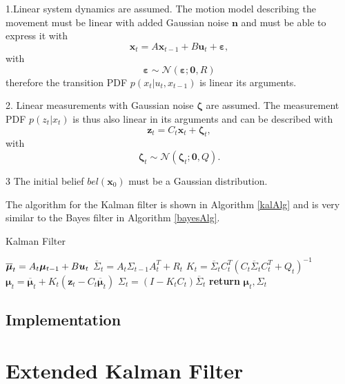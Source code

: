\documentclass[12pt,oneside,openany,a4paper, %
afrikaans,english,
]{memoir}
\numberwithin{equation}{chapter}
\begin{document}
1.Linear system dynamics are assumed. The motion model describing the movement must be linear with added Gaussian noise $\bm{n}$ and must be able to express it with 
\begin{equation}
\bm{x}_t = A \bm{x}_{t - 1} + B \bm{u}_t + \bm{\varepsilon},
\end{equation}
with 
\begin{equation}
\bm{\varepsilon} \sim \mathcal{N}(\bm{\varepsilon}; \bm{0}, R)
\end{equation}
therefore the transition PDF $p(x_t|u_t, x_{t-1})$ is linear its arguments.

2. Linear measurements with Gaussian noise $\bm{\zeta}$ are assumed. The measurement PDF $p(z_t|x_t)$ is thus also linear in its arguments and can be described with
\begin{equation}
\bm{z}_t = C_t \bm{x}_t + \bm{\zeta}_t,
\end{equation} 
with
\begin{equation}
\bm{\zeta}_t \sim \mathcal{N}(\bm{\zeta}_t; \bm{0}, Q).
\end{equation}

3 The initial belief $bel(\bm{x}_0)$ must be a Gaussian distribution.

The algorithm for the Kalman filter is shown in Algorithm \ref{kalAlg} and is very similar to the Bayes filter in Algorithm \ref{bayesAlg}.	
\begin{algorithm}
\caption{Kalman Filter}\label{kalAlg}
\begin{algorithmic}[1]
\State $\overline{\bm{\mu}}_t = A_t \bm{\mu}_{t-1} + B \bm{u_}t$
\State $\overline{\Sigma}_t = A_t \Sigma_{t-1} A_t^T + R_t$
\State $K_t = \overline{\Sigma}_t C_t^T(C_t\overline{\Sigma}_t C_t^T + Q_t)^{-1}$
\State $\bm{\mu}_t = \overline{\bm{\mu}}_t + K_t(\bm{z}_t - C_t \overline{\bm{\mu}}_t)$
\State $\Sigma_t = (I - K_tC_t)\overline{\Sigma}_t$
\State \textbf{return} $\bm{\mu}_t, \Sigma_t$
\EndProcedure
\end{algorithmic}
\end{algorithm}


\subsection{Implementation}

\section{Extended Kalman Filter}
\end{document}
